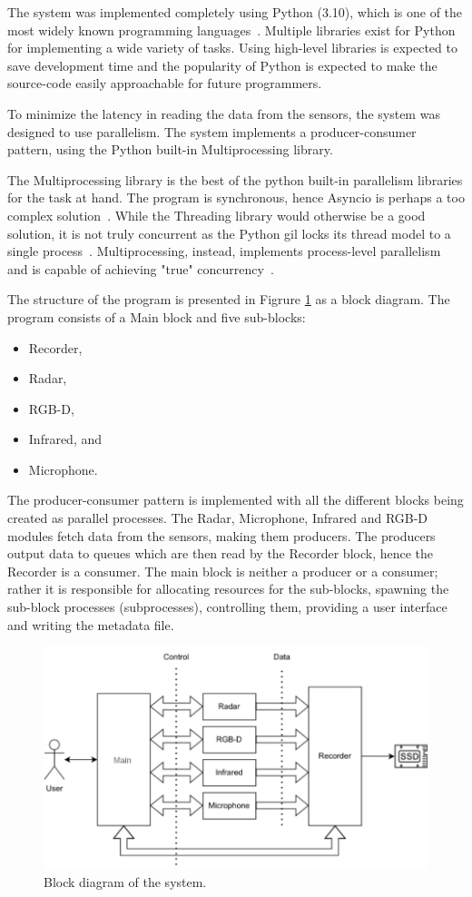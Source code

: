 The system was implemented completely using Python (3.10),
which is one of the most widely known programming languages~\cite{developer-survey}.
Multiple libraries exist for Python for implementing a wide variety of tasks.
Using high-level libraries is expected to save development time and the popularity of Python
is expected to make the source-code easily approachable for future programmers.

To minimize the latency in reading the data from the sensors,
the system was designed to use parallelism.
The system implements a producer-consumer pattern,
using the Python built-in Multiprocessing library.

The Multiprocessing library is the best of the python built-in parallelism libraries for the task at hand.
The program is synchronous, hence Asyncio is perhaps a too complex solution~\cite{python-asyncio}.
While the Threading library would otherwise be a good solution,
it is not truly concurrent as the Python \gls{gil} locks its thread model to a single process~\cite{python-threading}.
Multiprocessing, instead, implements process-level parallelism and is capable of achieving "true" concurrency~\cite{python-multiprocessing}.

The structure of the program is presented in Figrure \ref{fig:3-block-diagram} as a block diagram.
The program consists of a Main block and five sub-blocks:
\begin{itemize}
    \item Recorder,
    \item Radar,
    \item RGB-D,
    \item Infrared, and
    \item Microphone.
\end{itemize}

The producer-consumer pattern is implemented with all the different blocks being created as parallel processes.
The Radar, Microphone, Infrared and RGB-D modules fetch data from the sensors, making them producers.
The producers output data to queues which are then read by the Recorder block,
hence the Recorder is a consumer.
The main block is neither a producer or a consumer; rather it is responsible for allocating resources for the sub-blocks,
spawning the sub-block processes (subprocesses), controlling them, providing a user interface and writing the metadata file.

\begin{figure}[h]
    \centering
    \includegraphics[width=.8\textwidth]{fig/3/block_diagram.pdf}
    \caption{Block diagram of the system.}
    \label{fig:3-block-diagram}
\end{figure}

